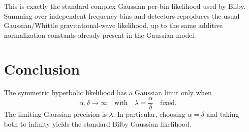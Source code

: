 \documentclass[11pt]{article}
\begin{document}
This is exactly the standard complex Gaussian per-bin likelihood used by Bilby. Summing over
independent frequency bins and detectors reproduces the usual Gaussian/Whittle gravitational-wave
likelihood, up to the same additive normalization constants already present in the Gaussian model.

\section*{Conclusion}

The symmetric hyperbolic likelihood has a Gaussian limit only when
\begin{equation}
  \alpha, \delta \to \infty
  \quad \text{with} \quad
  \lambda = \frac{\alpha}{\delta}
  \quad \text{fixed}.
\end{equation}
The limiting Gaussian precision is $\lambda$. In particular, choosing $\alpha = \delta$ and
taking both to infinity yields the standard Bilby Gaussian likelihood.
\end{document}
